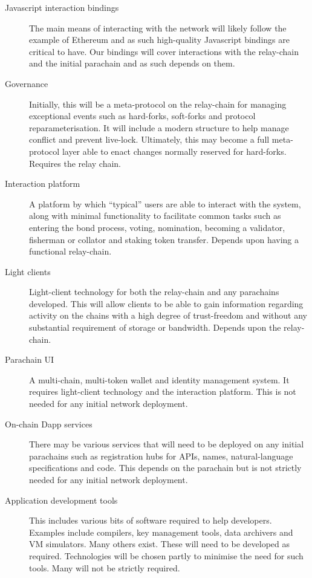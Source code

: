 \begin{description}
\item[Javascript interaction bindings] The main means of interacting with the network will likely follow the example of Ethereum and as such high-quality Javascript bindings are critical to have. Our bindings will cover interactions with the relay-chain and the initial parachain and as such depends on them.

\item[Governance] Initially, this will be a meta-protocol on the relay-chain for managing exceptional events such as hard-forks, soft-forks and protocol reparameterisation. It will include a modern structure to help manage conflict and prevent live-lock. Ultimately, this may become a full meta-protocol layer able to enact changes normally reserved for hard-forks. Requires the relay chain.

\item[Interaction platform] A platform by which ``typical'' users are able to interact with the system, along with minimal functionality to facilitate common tasks such as entering the bond process, voting, nomination, becoming a validator, fisherman or collator and staking token transfer. Depends upon having a functional relay-chain.

\item[Light clients] Light-client technology for both the relay-chain and any parachains developed. This will allow clients to be able to gain information regarding activity on the chains with a high degree of trust-freedom and without any substantial requirement of storage or bandwidth. Depends upon the relay-chain.

\item[Parachain UI] A multi-chain, multi-token wallet and identity management system. It requires light-client technology and the interaction platform. This is not needed for any initial network deployment.

\item[On-chain Dapp services] There may be various services that will need to be deployed on any initial parachains such as registration hubs for APIs, names, natural-language specifications and code. This depends on the parachain but is not strictly needed for any initial network deployment.

\item[Application development tools] This includes various bits of software required to help developers. Examples include compilers, key management tools, data archivers and VM simulators. Many others exist. These will need to be developed as required. Technologies will be chosen partly to minimise the need for such tools. Many will not be strictly required.


\end{description}
